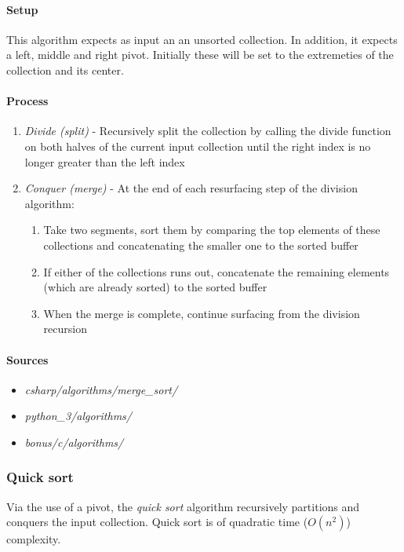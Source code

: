 \documentclass{article}
\begin{document}
{\paragraph{Setup}
This algorithm expects as input an an unsorted collection. In addition, it expects a left, middle and right pivot.
Initially these will be set to the extremeties of the collection and its center.

\paragraph{Process}
\begin{enumerate}
\item{{\em Divide (split)} - Recursively split the collection by calling the divide function on both halves of the
current input collection until the right index is no longer greater than the left index}
\item{{\em Conquer (merge)} - At the end of each resurfacing step of the division algorithm:}
  \begin{enumerate}
  \item{Take two segments, sort them by comparing the top elements of these collections and concatenating the smaller
    one to the sorted buffer}
  \item{If either of the collections runs out, concatenate the remaining elements (which are already sorted) to the
    sorted buffer}
  \item{When the merge is complete, continue surfacing from the division recursion}
  \end{enumerate}
\end{enumerate}

\begin{samepage}
  \paragraph{Sources}
  \begin{itemize}
  \item{{\em csharp/algorithms/merge\_sort/}}
  \item{{\em python\_3/algorithms/}}
  \item{{\em bonus/c/algorithms/}}
  \end{itemize}
\end{samepage}


\subsubsection{Quick sort}
Via the use of a pivot, the {\em quick sort} algorithm recursively partitions and conquers the input collection.
Quick sort is of quadratic time (\(O(n^2)\)) complexity.

}
\end{document}

